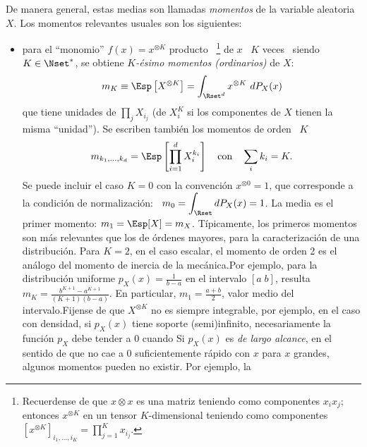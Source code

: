 De  manera general,  estas medias  son llamadas  {\it momentos}  de  la variable
aleatoria $X$. Los momentos relevantes usuales son los siguientes:
%
\begin{itemize}
\item    para    el    ``monomio''    $f(x)   =    x^{\otimes    K}$    producto
  ~\footnote{Recuerdense  de  que $x  \otimes  x$  es una  matriz
    teniendo como componentes  $x_i x_j$; entonces $x^{\otimes K}$  en un tensor
    $K$-dimensional teniendo como  componentes $ \displaystyle \left[ x^{\otimes
        K}  \right]_{i_1,\ldots,i_K} =  \prod_{j=1}^K x_{i_j}$.}
   de $x$  \ $K$
  veces \ siendo \ $K \in \Nset^*$, se obtiene  $K${\it-\'esimo momentos (ordinarios)} de $X$:
  \[
  m_K \equiv \Esp\left[  X^{\otimes K} \right] = \int_{\Rset^d}  x^{\otimes K} \
  dP_X(x)
  \]
  que tiene unidades de $\prod_j X_{i_j}$  (de $X_i^K$ si los componentes de $X$
  tienen la  misma ``unidad'').  Se escriben  tambi\'en los momentos  de orden \
  $K$ \ 
  \[
  m_{k_1,\ldots,k_d}  =  \Esp\left[   \prod_{i=1}^d  X_i^{k_i}  \right]  \quad
  \mbox{con} \quad \sum_i k_i = K.
  \]
     Se puede incluir el caso $K=0$ con
  la  convenci\'on $x^{\otimes  0} =  1$, que  corresponde a  la  condici\'on de
  normalizaci\'on: \ $\displaystyle m_0 =  \int_\Rset dP_X(x) = 1$.  La media es
  el  primer  momento: $m_1  =  \Esp[X]  =  m_X$.  T\'ipicamente,  los  primeros
  momentos  son  m\'as  relevantes  que   los  de  \'ordenes  mayores,  para  la
  caracterizaci\'on de una distribuci\'on.  Para $K = 2$, en el caso escalar, el
  momento  de   orden  2  es  el   an\'alogo  del  momento  de   inercia  de  la
  mec\'anica.\newline  Por ejemplo,  para la  distribuci\'on uniforme  $p_X(x) =
  \frac{1}{b-a}$   en   el   intervalo   $[   a   \;   b]$,   resulta   $m_K   =
  \frac{b^{K+1}-a^{K+1}}{(K+1)(b-a)}$.   En particular,  $m_1  = \frac{a+b}{2}$,
  valor  medio del  intervalo.\newline  Fijense  de que  $X^{\otimes  K}$ no  es
  siempre integrable,  por ejemplo, en el  caso con densidad,  si $p_X(x)$ tiene
  soporte  (semi)infinito, necesariamente  la funci\'on  $p_X$ debe  tender  a 0
  cuando \modif{$\|  x \|  \rightarrow \infty$.}  Si  $p_X(x)$ es {\it  de largo
    alcance}, en el  sentido de que no cae a 0  suficientemente r\'apido con $x$
  para  $x$  grandes, algunos  momentos  pueden  no  existir.  Por  ejemplo,  la

\end{itemize}
